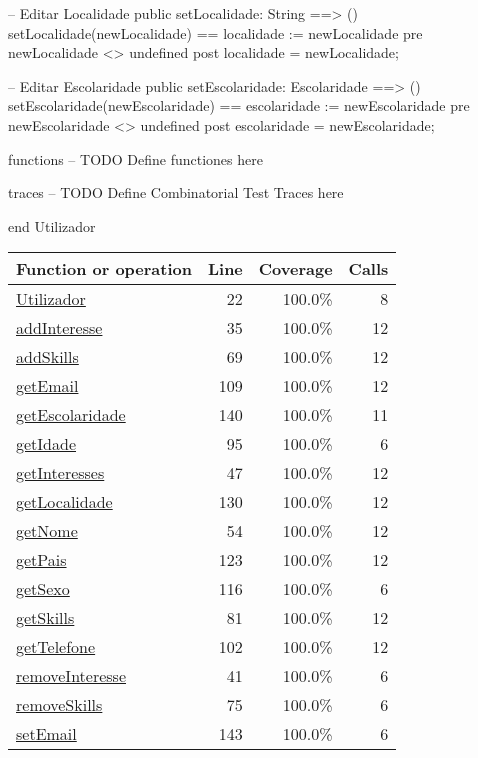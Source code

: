 \begin{vdmpp}[breaklines=true]
 -- Editar Localidade
 public setLocalidade: String ==> ()
 setLocalidade(newLocalidade) == localidade := newLocalidade
 pre newLocalidade <> undefined
 post localidade = newLocalidade;
 
 -- Editar Escolaridade
 public setEscolaridade: Escolaridade ==> ()
 setEscolaridade(newEscolaridade) == escolaridade := newEscolaridade
 pre newEscolaridade <> undefined
 post escolaridade = newEscolaridade;
 
functions
-- TODO Define functiones here

traces
-- TODO Define Combinatorial Test Traces here

end Utilizador
\end{vdmpp}
\bigskip
\begin{longtable}{|l|r|r|r|}
\hline
Function or operation & Line & Coverage & Calls \\
\hline
\hline
\hyperref[Utilizador:22]{Utilizador} & 22&100.0\% & 8 \\
\hline
\hyperref[addInteresse:35]{addInteresse} & 35&100.0\% & 12 \\
\hline
\hyperref[addSkills:69]{addSkills} & 69&100.0\% & 12 \\
\hline
\hyperref[getEmail:109]{getEmail} & 109&100.0\% & 12 \\
\hline
\hyperref[getEscolaridade:140]{getEscolaridade} & 140&100.0\% & 11 \\
\hline
\hyperref[getIdade:95]{getIdade} & 95&100.0\% & 6 \\
\hline
\hyperref[getInteresses:47]{getInteresses} & 47&100.0\% & 12 \\
\hline
\hyperref[getLocalidade:130]{getLocalidade} & 130&100.0\% & 12 \\
\hline
\hyperref[getNome:54]{getNome} & 54&100.0\% & 12 \\
\hline
\hyperref[getPais:123]{getPais} & 123&100.0\% & 12 \\
\hline
\hyperref[getSexo:116]{getSexo} & 116&100.0\% & 6 \\
\hline
\hyperref[getSkills:81]{getSkills} & 81&100.0\% & 12 \\
\hline
\hyperref[getTelefone:102]{getTelefone} & 102&100.0\% & 12 \\
\hline
\hyperref[removeInteresse:41]{removeInteresse} & 41&100.0\% & 6 \\
\hline
\hyperref[removeSkills:75]{removeSkills} & 75&100.0\% & 6 \\
\hline
\hyperref[setEmail:143]{setEmail} & 143&100.0\% & 6 \\

\end{longtable}

